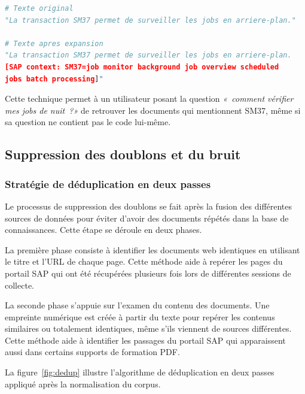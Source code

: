 \begin{lstlisting}[language=Python, caption={Exemple d’expansion sémantique pour SM37}]
# Texte original
"La transaction SM37 permet de surveiller les jobs en arriere-plan."

# Texte apres expansion
"La transaction SM37 permet de surveiller les jobs en arriere-plan.
[SAP context: SM37=job monitor background job overview scheduled
jobs batch processing]"
\end{lstlisting}

Cette technique permet à un utilisateur posant la question
\textit{«~comment vérifier mes jobs de nuit~?»} de retrouver les documents qui mentionnent
SM37, même si sa question ne contient pas le code lui-même.

\subsection{Suppression des doublons et du bruit}
\label{subsec:deduplication}

\subsubsection{Stratégie de déduplication en deux passes}

Le processus de suppression des doublons se fait après la fusion des différentes sources de données pour éviter d’avoir des documents répétés dans la base de connaissances. Cette étape se déroule en deux phases.

La première phase consiste à identifier les documents web identiques en utilisant le titre et l'URL de chaque page. Cette méthode aide à repérer les pages du portail SAP qui ont été récupérées plusieurs fois lors de différentes sessions de collecte.

La seconde phase s’appuie sur l'examen du contenu des documents. Une empreinte numérique est créée à partir du texte pour repérer les contenus similaires ou totalement identiques, même s'ils viennent de sources différentes. Cette méthode aide à identifier les passages du portail SAP qui apparaissent aussi dans certains supports de formation PDF.

%
La figure~\ref{fig:dedup} illustre l'algorithme de déduplication en deux passes appliqué après la normalisation du corpus.

